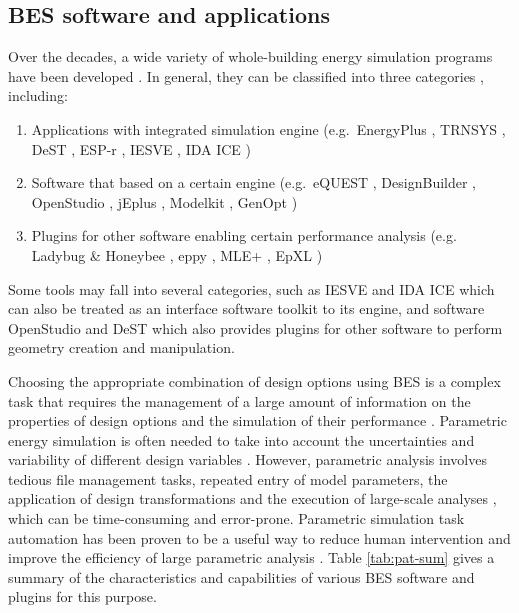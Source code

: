 \documentclass[3p, times]{elsarticle} %
\providecommand{\tightlist}{%
  \setlength{\itemsep}{0pt}\setlength{\parskip}{0pt}}
\begin{document}
\hypertarget{bes-software-and-applications}{%
\subsection{BES software and applications}\label{bes-software-and-applications}}

Over the decades, a wide variety of whole-building energy simulation programs
have been developed \citep{Crawley2008a}.
In general, they can be classified into three categories \citep{Ostergard2016},
including:

\begin{enumerate}
\def\labelenumi{\arabic{enumi}.}
\tightlist
\item
  Applications with integrated simulation engine (e.g.~EnergyPlus
  \citep{Crawley2001}, TRNSYS \citep{Beckman1994}, DeST \citep{Yan2008}, ESP-r \citep{Hand2018},
  IESVE \citep{IntegratedEnvironmentalSolutionsLimited2020}, IDA ICE
  \citep{Kalamees2004})
\item
  Software that based on a certain engine (e.g.~eQUEST \citep{Hirsch2020},
  DesignBuilder \citep{DesignBuilderSoftwareLtd2020a}, OpenStudio
  \citep{Guglielmetti2011}, jEplus \citep{Yi2020}, Modelkit \citep{BigLadderSoftware2020},
  GenOpt \citep{Wetter2001})
\item
  Plugins for other software enabling certain performance analysis (e.g.
  Ladybug \& Honeybee \citep{Roudsari2013, Tabadkani2019}, eppy \citep{Philip2020}, MLE+
  \citep{Bernal2012, Zhao2013b}, EpXL \citep{Schild2020})
\end{enumerate}

Some tools may fall into several categories, such as IESVE and IDA ICE which
can also be treated as an interface software toolkit to its engine, and
software OpenStudio and DeST which also provides plugins for other software to
perform geometry creation and manipulation.

Choosing the appropriate combination of design options using BES is a complex
task that requires the management of a large amount of information on the
properties of design options and the simulation of their performance
\citep{Purup2020}.
Parametric energy simulation is often needed to take into account the
uncertainties and variability of different design variables \citep{Tian2018review}.
However, parametric analysis involves tedious file management tasks, repeated
entry of model parameters, the application of design transformations and the
execution of large-scale analyses \citep{Macumber2012}, which can be time-consuming
and error-prone.
Parametric simulation task automation has been proven to be a useful way to
reduce human intervention and improve the efficiency of large parametric
analysis \citep{Roth2018}.
Table \ref{tab:pat-sum} gives a summary of the characteristics and
capabilities of various BES software and plugins for this purpose.
\end{document}

